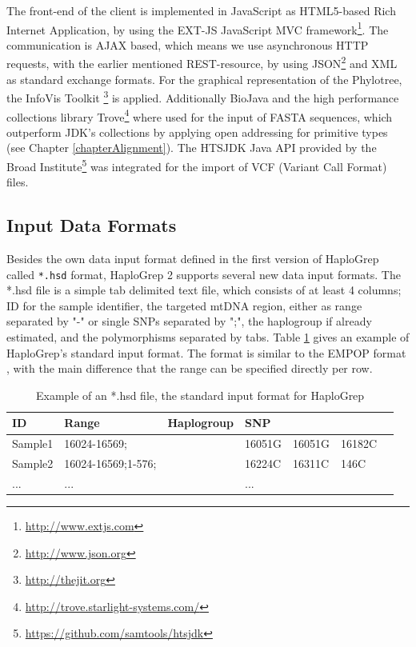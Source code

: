 The front-end of the client is implemented in JavaScript as HTML5-based Rich Internet Application, by using the EXT-JS JavaScript MVC framework\footnote{\url{http://www.extjs.com}}. The communication is AJAX based, which means we use asynchronous HTTP requests, with the earlier mentioned REST-resource, by using JSON\footnote{\url{http://www.json.org}} and XML as standard exchange formats. For the graphical representation of the Phylotree, the InfoVis Toolkit \footnote{\url{http://thejit.org}} is applied. Additionally BioJava \cite{Prlic2012} and the high performance collections library Trove\footnote{\url{http://trove.starlight-systems.com/}} where used for the input of FASTA sequences, which outperform JDK's collections by applying open addressing for primitive types (see Chapter \ref{chapterAlignment}). The HTSJDK Java API provided by the Broad Institute\footnote{\url{https://github.com/samtools/htsjdk}} was integrated for the import of VCF (Variant Call Format) files.

\subsection{Input Data Formats}\label{hg:input}
Besides the own data input format defined in the first version of HaploGrep called \verb|*.hsd| format, HaploGrep 2 supports several new data input formats. 
The *.hsd file is a simple tab delimited text file, which consists of at least 4 columns; ID for the sample identifier, the targeted mtDNA region, either as range separated by "-" or single SNPs separated by ";", the haplogroup if already estimated, and the polymorphisms separated by tabs. Table \ref{table:hsd} gives an example of HaploGrep's standard input format.
The format is similar to the EMPOP format \cite{Parson2007}, with the main difference that the range can be specified directly per row.
\begin{table}[H]
  \begin{tabular}{lllllll}
    \toprule
    ID & Range & Haplogroup & SNP &  &  \\
		\midrule
	Sample1 & 16024-16569; &  & 16051G & 16051G & 16182C\\
	Sample2 & 16024-16569;1-576; &  & 16224C & 16311C & 146C\\
	... & ... & & ... & & & \\
		\bottomrule
\end{tabular}
\caption{Example of an *.hsd file, the standard input format for HaploGrep}
\label{table:hsd}
\end{table}

